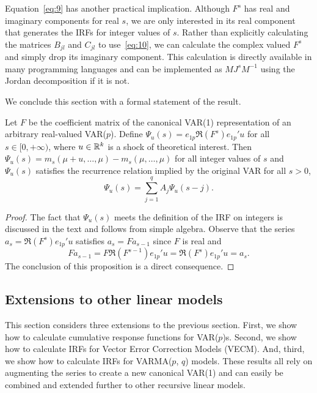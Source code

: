 \documentclass[12pt,fleqn]{article}
\begin{document}
Equation~\eqref{eq:9} has another practical implication. Although
$F^s$ has real and imaginary components for real $s$, we are only
interested in its real component that generates the IRFs for integer
values of $s$. Rather than explicitly calculating the matrices
$B_{jl}$ and $C_{jl}$ to use~\eqref{eq:10}, we can calculate the
complex valued $F^s$ and simply drop its imaginary component. This
calculation is directly available in many programming languages and
can be implemented as $M J^s M^{-1}$ using the Jordan decomposition if
it is not.

We conclude this section with a formal statement of the result.

\begin{proposition}
  \label{P1}
  Let $F$ be the coefficient matrix of the canonical VAR(1)
  representation of an arbitrary real-valued VAR($p$). Define
  $\Psi_u(s) = e_{1p} \Re(F^s) e_{1p}' u$ for all $s \in [0,+\infty)$, where
  $u \in \mathbb{R}^k$ is a shock of theoretical interest. Then
  $\Psi_u(s) = m_s(\mu + u, \dots, \mu) - m_s(\mu,\dots,\mu)$ for all
  integer values of $s$ and $\Psi_u(s)$ satisfies the recurrence
  relation implied by the original VAR for all $s > 0$,
  \begin{equation}
    \label{eq:11}
    \Psi_u(s) = \sum_{j=1}^q A_j \Psi_u(s-j).
  \end{equation}
\end{proposition}
\begin{proof}
  The fact that $\Psi_u(s)$ meets the definition of the IRF on
  integers is discussed in the text and follows from simple
  algebra. Observe that the series $a_s = \Re(F^s) e_{1p}'u$ satisfies
  $a_s = F a_{s-1}$ since $F$ is real and
  \[
    F a_{s-1} = F \Re(F^{s-1}) e_{1p}'u
    = \Re(F^s) e_{1p}'u
    = a_s.
  \]
  The conclusion of this proposition is a direct consequence.
\end{proof}

\subsection[Finite-order linear models]{Extensions to other linear models}
\label{S2.3}

This section considers three extensions to the previous section.
First, we show how to calculate cumulative response functions for
VAR($p$)s. Second, we show how to calculate IRFs for Vector Error
Correction Models (VECM). And, third, we show how to calculate IRFs
for VARMA($p$, $q$) models. These results all rely on augmenting the
series to create a new canonical VAR(1) and can easily be combined
and extended further to other recursive linear models.
\end{document}
